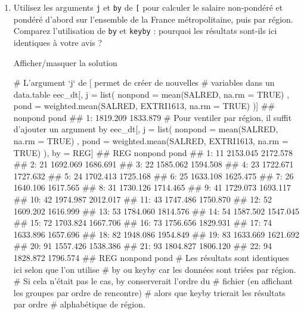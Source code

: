 \documentclass[12pt,]{article}
\newenvironment{Shaded}{}{}
\newcommand{\KeywordTok}[1]{\textcolor[rgb]{0.00,0.00,1.00}{{#1}}}
\newcommand{\DataTypeTok}[1]{{#1}}
\newcommand{\StringTok}[1]{\textcolor[rgb]{0.00,0.50,0.50}{{#1}}}
\newcommand{\CommentTok}[1]{\textcolor[rgb]{0.00,0.50,0.00}{{#1}}}
\newcommand{\OtherTok}[1]{\textcolor[rgb]{1.00,0.25,0.00}{{#1}}}
\newcommand{\NormalTok}[1]{{#1}}
\begin{document}
\begin{enumerate}
\def\labelenumi{\alph{enumi}.}
\item
  Utilisez les arguments \texttt{j} et \texttt{by} de \texttt{{[}} pour
  calculer le salaire non-pondéré et pondéré d'abord sur l'ensemble de
  la France métropolitaine, puis par région. Comparez l'utilisation de
  \texttt{by} et \texttt{keyby} : pourquoi les résultats sont-ils ici
  identiques à votre avis ?

  Afficher/masquer la solution

  \hypertarget{sol62}{}
\begin{Shaded}
\begin{Highlighting}[]
\CommentTok{# L'argument `j` de [ permet de créer de nouvelles }
\CommentTok{# variables dans un data.table}
\NormalTok{eec_dt[, j =}\StringTok{ }\KeywordTok{list}\NormalTok{(}
  \DataTypeTok{nonpond =} \KeywordTok{mean}\NormalTok{(SALRED, }\DataTypeTok{na.rm =} \OtherTok{TRUE}\NormalTok{)}
  \NormalTok{, }\DataTypeTok{pond =} \KeywordTok{weighted.mean}\NormalTok{(SALRED, EXTRI1613, }\DataTypeTok{na.rm =} \OtherTok{TRUE}\NormalTok{)}
\NormalTok{)]}
\NormalTok{##     nonpond     pond}
\NormalTok{## 1: 1819.209 1833.879}
\CommentTok{# Pour ventiler par région, il suffit d'ajouter un argument by}
\NormalTok{eec_dt[, j =}\StringTok{ }\KeywordTok{list}\NormalTok{(}
  \DataTypeTok{nonpond =} \KeywordTok{mean}\NormalTok{(SALRED, }\DataTypeTok{na.rm =} \OtherTok{TRUE}\NormalTok{)}
  \NormalTok{, }\DataTypeTok{pond =} \KeywordTok{weighted.mean}\NormalTok{(SALRED, EXTRI1613, }\DataTypeTok{na.rm =} \OtherTok{TRUE}\NormalTok{)}
\NormalTok{), by =}\StringTok{ }\NormalTok{REG]  }
\NormalTok{##     REG  nonpond     pond}
\NormalTok{##  1:  11 2153.045 2172.578}
\NormalTok{##  2:  21 1692.069 1686.691}
\NormalTok{##  3:  22 1585.062 1594.508}
\NormalTok{##  4:  23 1722.671 1727.632}
\NormalTok{##  5:  24 1702.413 1725.168}
\NormalTok{##  6:  25 1633.108 1625.475}
\NormalTok{##  7:  26 1640.106 1617.565}
\NormalTok{##  8:  31 1730.126 1714.465}
\NormalTok{##  9:  41 1729.073 1693.117}
\NormalTok{## 10:  42 1974.987 2012.017}
\NormalTok{## 11:  43 1747.486 1750.870}
\NormalTok{## 12:  52 1609.202 1616.999}
\NormalTok{## 13:  53 1784.060 1814.576}
\NormalTok{## 14:  54 1587.502 1547.045}
\NormalTok{## 15:  72 1703.824 1667.706}
\NormalTok{## 16:  73 1756.656 1829.931}
\NormalTok{## 17:  74 1633.896 1657.696}
\NormalTok{## 18:  82 1948.086 1954.849}
\NormalTok{## 19:  83 1633.669 1621.692}
\NormalTok{## 20:  91 1557.426 1538.386}
\NormalTok{## 21:  93 1804.827 1806.120}
\NormalTok{## 22:  94 1828.872 1796.574}
\NormalTok{##     REG  nonpond     pond}
\CommentTok{# Les résultats sont identiques ici selon que l'on utilise}
\CommentTok{# by ou keyby car les données sont triées par région.}
\CommentTok{# Si cela n'était pas le cas, by conserverait l'ordre du}
\CommentTok{# fichier (en affichant les groupes par ordre de rencontre)}
\CommentTok{# alors que keyby trierait les résultats par ordre}
\CommentTok{# alphabétique de région.}
\end{Highlighting}
\end{Shaded}


\end{enumerate}
\end{document}
